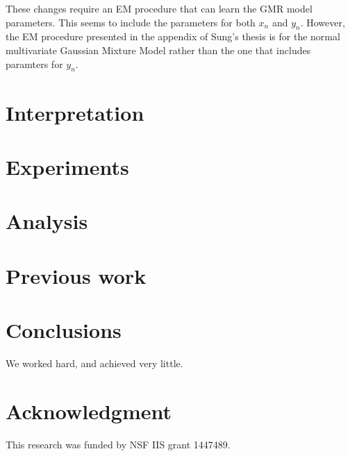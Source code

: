 \documentclass[10pt]{proc}
\begin{document}
These changes require an EM procedure that can learn the GMR model parameters.
This seems to include the parameters for both $x_n$ and $y_n$. However, the EM
procedure presented in the appendix of Sung's thesis is for the normal
multivariate Gaussian Mixture Model rather than the one that includes paramters
for $y_n$.

\section{Interpretation}\label{interpretation}

\section{Experiments}\label{experiments}

\section{Analysis}\label{analysis}

\section{Previous work}\label{previous work}

\section{Conclusions}\label{conclusions}
We worked hard, and achieved very little.

\section*{Acknowledgment}
This research was funded by NSF IIS grant 1447489.




\end{document}
